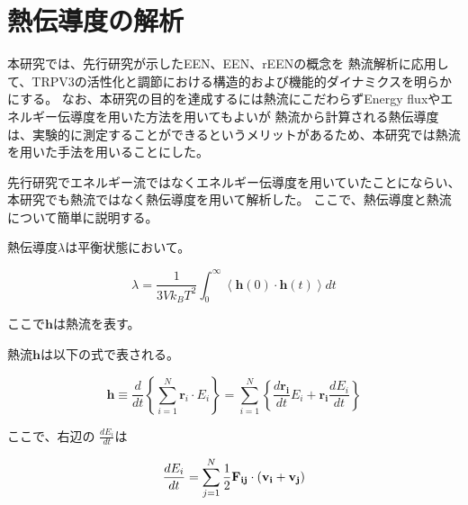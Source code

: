 

\section{熱伝導度の解析}
本研究では、先行研究が示したEEN、\Delta EEN、r\Delta EENの概念\autocite{ishikura2015,ota_energy_2019,poudel_energy_2022}を
熱流解析に応用して、TRPV3の活性化と調節における構造的および機能的ダイナミクスを明らかにする。
なお、本研究の目的を達成するには熱流にこだわらずEnergy fluxやエネルギー伝導度を用いた方法を用いてもよいが
熱流から計算される熱伝導度は、実験的に測定することができるというメリットがあるため、本研究では熱流を用いた手法を用いることにした。

先行研究でエネルギー流ではなくエネルギー伝導度を用いていたことにならい、本研究でも熱流ではなく熱伝導度を用いて解析した。
ここで、熱伝導度と熱流について簡単に説明する。

熱伝導度$\lambda$は平衡状態において。

\begin{equation}
  \label{eq:thermal_conductivity}
  \lambda = \frac{1}{3Vk_B T^2} \int_{0}^{\infty} \left\langle
    \bm{h}(0) \cdot \bm{h}(t)
  \right\rangle dt
\end{equation}

ここで$\mathbf{h}$は熱流を表す。\autocite{mcquarrie_statistical_2000}

熱流$\mathbf{h}$は以下の式で表される。

\begin{equation}
  \label{eq:heat_flow}
  \bm{h} \equiv \frac{d}{dt} \left\{
    \sum_{i=1}^{N} \bm{r}_i \cdot E_i
  \right\} = \sum_{i=1}^{N} \left\{
    \frac{d\bm{r_i}}{dt}E_i + \bm{r_i}\frac{dE_i}{dt}
  \right\}
\end{equation}

ここで、右辺の $\frac{dE_i}{dt}$は

\begin{equation}
  \label{time_derivative_of_energy}
  \frac{dE_i}{dt} = \sum_{j=1}^{N} \frac{1}{2} \bf{F}_{ij} \cdot (\bf{v}_i + \bf{v}_j)
\end{equation}

